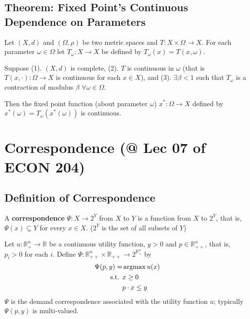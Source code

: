 \documentclass[11pt]{elegantbook}
\newcommand{\argmax}{\operatornamewithlimits{argmax}}
\begin{document}
\subsection{Theorem: Fixed Point's Continuous Dependence on Parameters}
\begin{theorem}
    Let $(X, d)$ and $(\Omega, \rho)$ be two metric spaces and $T : X \times \Omega \rightarrow X$. For each parameter $\omega \in \Omega$ let $T_\omega : X \rightarrow X$ be defined by $T_\omega(x)=T(x,\omega)$.

    Suppose (1). $(X, d)$ is complete, (2). $T$ is continuous in $\omega$ (that is $T(x, \cdot) : \Omega \rightarrow X$ is continuous for each $x \in X$), and (3). $\exists \beta < 1$ such that $T_\omega$ is a contraction of modulus $\beta$ $\forall \omega \in \Omega$.
    
    Then the fixed point function (about parameter $\omega$) $x^*: \Omega \rightarrow X$ defined by $x^*(\omega)=T_\omega(x^*(\omega))$ is continuous.
\end{theorem}


\section{Correspondence \small{(@ Lec 07 of ECON 204)}}
\subsection{Definition of Correspondence}
\begin{definition}[Correspondence]
    \normalfont
    A \textbf{correspondence} $\Psi : X \rightarrow 2^Y$ from $X$ to $Y$ is a function from $X$ to $2^Y$, that is, $\Psi(x) \subseteq Y$ for every $x \in X$. ($2^Y$ is the set of all subsets of $Y$)
\end{definition}
\begin{example}
Let $u : \mathbb{R}_+^n \rightarrow \mathbb{R}$ be a continuous utility function, $y > 0$ and $p \in \mathbb{R}_{++}^n$, that is, $p_i > 0$ for each $i$. Define $\Psi : \mathbb{R}_{++}^n \times \mathbb{R}_{++} \rightarrow 2^{\mathbb{R}_{+}^n}$ by
\begin{equation}
    \begin{aligned}
        \Psi(p,y)=&\argmax u(x)\\
        \textnormal{s.t. }&x\geq 0\\
        &p\cdot x\leq y
    \end{aligned}
    \nonumber
\end{equation}
$\Psi$ is the demand correspondence associated with the utility function $u$; typically $\Psi(p, y)$ is multi-valued.
\end{example}
\end{document}
